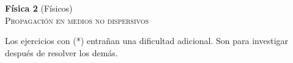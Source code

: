 \documentclass[11pt,spanish,a4paper]{article}
\begin{document}
\begin{center}
\textbf{Física 2} (Físicos) \hfill {}\\
	\textsc{\LARGE Propagación en medios no dispersivos}
\end{center}

Los ejercicios con (*) entrañan una dificultad adicional. Son para investigar después de resolver los demás.



\begin{enumerate}


}


\end{enumerate}
\end{document}
